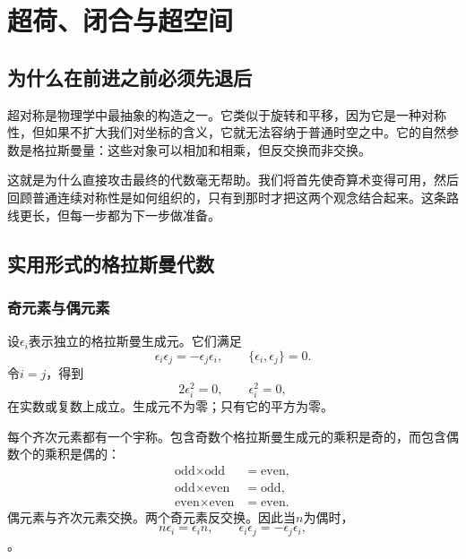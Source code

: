 \chapter{超荷、闭合与超空间}


\section{为什么在前进之前必须先退后}

超对称是物理学中最抽象的构造之一。它类似于旋转和平移，因为它是一种对称性，但如果不扩大我们对坐标的含义，它就无法容纳于普通时空之中。它的自然参数是格拉斯曼量：这些对象可以相加和相乘，但反交换而非交换。

这就是为什么直接攻击最终的代数毫无帮助。我们将首先使奇算术变得可用，然后回顾普通连续对称性是如何组织的，只有到那时才把这两个观念结合起来。这条路线更长，但每一步都为下一步做准备。

\section{实用形式的格拉斯曼代数}

\subsection{奇元素与偶元素}

设\(\epsilon_i\)表示独立的格拉斯曼生成元。它们满足
\begin{equation}
\epsilon_i\epsilon_j=-\epsilon_j\epsilon_i,
\qquad
\{\epsilon_i,\epsilon_j\}=0.
\end{equation}
令\(i=j\)，得到
\begin{equation}
2\epsilon_i^2=0,
\qquad
\epsilon_i^2=0,
\end{equation}
在实数或复数上成立。生成元不为零；只有它的平方为零。

每个齐次元素都有一个宇称。包含奇数个格拉斯曼生成元的乘积是奇的，而包含偶数个的乘积是偶的：
\begin{align}
\text{odd}\times\text{odd}&=\text{even},\\
\text{odd}\times\text{even}&=\text{odd},\\
\text{even}\times\text{even}&=\text{even}.
\end{align}
偶元素与齐次元素交换。两个奇元素反交换。因此当\(n\)为偶时，
\begin{equation}
n\epsilon_i=\epsilon_i n,
\qquad
\epsilon_i\epsilon_j=-\epsilon_j\epsilon_i,
\end{equation}。

